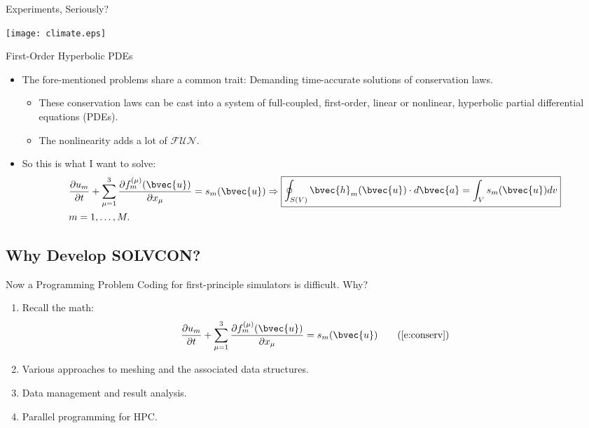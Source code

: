 \documentclass[dvips,xcolor=pst,14pt]{beamer}
\begin{document}
\begin{frame}{
%
Experiments, Seriously?
%
}
\begin{center}
  \texttt{[image: climate.eps]}
\end{center}
\end{frame}

\begin{frame}{
%
First-Order Hyperbolic PDEs
%
}
\begin{itemize}
  \item The fore-mentioned problems share a common trait: Demanding
  time-accurate solutions of conservation laws.
  \begin{itemize}
    \item These conservation laws can be cast into a system of full-coupled,
    first-order, linear or nonlinear, hyperbolic partial differential
    equations (PDEs).
    \item The nonlinearity adds a lot of $\mathcal{FUN}$.
  \end{itemize}
  \item So this is what I want to solve:
  {\footnotesize \begin{align}
   &\frac{\partial u_m}{\partial t}
      + \sum_{\mu=1}^3\frac{\partial f^{(\mu)}_m(\bvec{u})}{\partial x_{\mu}}
      = s_m(\bvec{u})
    \Rightarrow \boxed{\begin{gathered}
      \oint_{S(V)}\bvec{h}_m(\bvec{u})\cdot d\bvec{a}
      = \int_{V}s_m(\bvec{u})dv
    \end{gathered}} \label{e:conserv} \\
   &m = 1, \ldots, M. \notag
  \end{align}}
\end{itemize}
\end{frame}

\subsection{
Why Develop SOLVCON?
}

\begin{frame}{
%
Now a Programming Problem
%
}
Coding for first-principle simulators is difficult.  Why?
\begin{enumerate}
  \item Recall the math:
  {\footnotesize \begin{align}
   \frac{\partial u_m}{\partial t}
      + \sum_{\mu=1}^3\frac{\partial f^{(\mu)}_m(\bvec{u})}{\partial x_{\mu}}
      = s_m(\bvec{u}) \tag{\ref{e:conserv}}
  \end{align}}
  \item Various approaches to meshing and the associated data structures.
  \item Data management and result analysis.
  \item Parallel programming for HPC.
\end{enumerate}
\end{frame}
\end{document}
